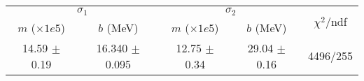 \begin{tabular}{cc|cc||c}
\multicolumn{2}{c|}{$\sigma_1$} & \multicolumn{2}{|c}{$\sigma_2$}  & \multirow{2}{*}{$\chi^2/$ndf}\\
$m$ ($\times1e5$) & $b$ (MeV) & $m$ ($\times1e5$) & $b$ (MeV)  & \\
\hline
14.59 $\pm$ 0.19 & 16.340 $\pm$ 0.095 & 12.75 $\pm$ 0.34 & 29.04 $\pm$ 0.16 & 4496/255\\
\end{tabular}
